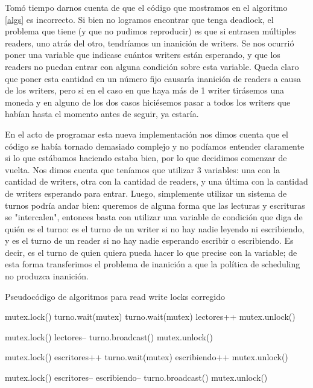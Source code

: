 \documentclass{article}
\begin{document}
Tomó tiempo darnos cuenta de que el código que mostramos en el algoritmo \ref{algs} es incorrecto. Si bien no logramos encontrar que tenga deadlock, el problema que tiene (y que no pudimos reproducir) es que si entrasen múltiples readers, uno atrás del otro, tendríamos un inanición de writers. Se nos ocurrió poner una variable que indicase cuántos writers están esperando, y que los readers no puedan entrar con alguna condición sobre esta variable. Queda claro que poner esta cantidad en un número fijo causaría inanición de readers a causa de los writers, pero si en el caso en que haya más de 1 writer tirásemos una moneda y en alguno de los dos casos hiciésemos pasar a todos los writers que habían hasta el momento antes de seguir, ya estaría.\par\smallbreak

En el acto de programar esta nueva implementación nos dimos cuenta que el código se había tornado demasiado complejo y no podíamos entender claramente si lo que estábamos haciendo estaba bien, por lo que decidimos comenzar de vuelta. Nos dimos cuenta que teníamos que utilizar 3 variables: una con la cantidad de writers, otra con la cantidad de readers, y una última con la cantidad de writers esperando para entrar. Luego, simplemente utilizar un sistema de turnos podría andar bien: queremos de alguna forma que las lecturas y escrituras se "intercalen", entonces basta con utilizar una variable de condición que diga de quién es el turno: es el turno de un writer si no hay nadie leyendo ni escribiendo, y es el turno de un reader si no hay nadie esperando escribir o escribiendo. Es decir, es el turno de quien quiera pueda hacer lo que precise con la variable; de esta forma transferimos el problema de inanición a que la política de scheduling no produzca inanición.

\begin{algorithm}[h!]
\caption{Pseudocódigo de algoritmos para read write locks corregido}
\label{algs2}
\begin{algorithmic}
    \State mutex.lock()
        \State turno.wait(mutex)
    \EndIf
        \State turno.wait(mutex)
    \EndWhile
    \State lectores++
    \State mutex.unlock()
\EndFunction

    \State mutex.lock()
    \State lectores--
    \State turno.broadcast()
    \State mutex.unlock()
\EndFunction

    \State mutex.lock()
    \State escritores++
        \State turno.wait(mutex)
    \EndWhile
    \State escribiendo++
    \State mutex.unlock()
\EndFunction

    \State mutex.lock()
    \State escritores--
    \State escribiendo--
    \State turno.broadcast()
    \State mutex.unlock()
\EndFunction
\end{algorithmic}
\end{algorithm}
\end{document}
